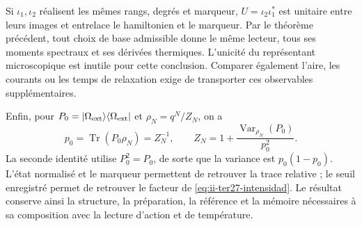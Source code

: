 Si $\iota_1,\iota_2$ réalisent les mêmes rangs, degrés et marqueur,
$U=\iota_2\iota_1^*$ est unitaire entre leurs images et entrelace
le hamiltonien et le marqueur. Par le théorème précédent, tout choix de
base admissible donne le même lecteur, tous ses moments spectraux et ses
dérivées thermiques. L’unicité du représentant microscopique est
inutile pour cette conclusion. Comparer également l’aire, les courants ou
les temps de relaxation exige de transporter ces observables supplémentaires.

Enfin, pour $P_0=|\Omega_{\rm ext}\rangle\langle\Omega_{\rm ext}|$
et $\rho_N=q^N/Z_N$, on a
\[
 p_0=\operatorname{Tr}(P_0\rho_N)=Z_N^{-1},\qquad
 Z_N=1+\frac{\operatorname{Var}_{\rho_N}(P_0)}{p_0^2}.
\]
La seconde identité utilise $P_0^2=P_0$, de sorte que la variance est
$p_0(1-p_0)$. L’état normalisé et le marqueur permettent de retrouver la trace
relative ; le seuil enregistré permet de retrouver le facteur de
\eqref{eq:ii-ter27-intensidad}. Le résultat conserve ainsi la structure,
la préparation, la référence et la mémoire nécessaires à sa composition
avec la lecture d’action et de température.
